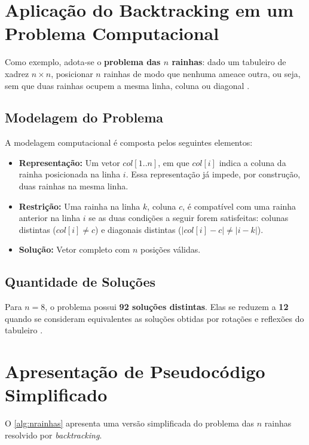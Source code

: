 \section{Aplicação do Backtracking em um Problema Computacional}

Como exemplo, adota-se o \textbf{problema das $n$ rainhas}: dado um tabuleiro de xadrez $n \times n$, posicionar $n$ rainhas de modo que nenhuma ameace outra, ou seja, sem que duas rainhas ocupem a mesma linha, coluna ou diagonal \cite{levitin2011, russell2013}.

\subsection{Modelagem do Problema}

A modelagem computacional é composta pelos seguintes elementos:

\begin{itemize}
    \item \textbf{Representação:} Um vetor $col[1..n]$, em que $col[i]$ indica a coluna da rainha posicionada na linha $i$. Essa representação já impede, por construção, duas rainhas na mesma linha.
    \item \textbf{Restrição:} Uma rainha na linha $k$, coluna $c$, é compatível com uma rainha anterior na linha $i$ se as duas condições a seguir forem satisfeitas: colunas distintas ($col[i] \neq c$) e diagonais distintas ($|col[i] - c| \neq |i - k|$).
    \item \textbf{Solução:} Vetor completo com $n$ posições válidas.
\end{itemize}

\subsection{Quantidade de Soluções}

Para $n = 8$, o problema possui \textbf{92 soluções distintas}. Elas se reduzem a \textbf{12} quando se consideram equivalentes as soluções obtidas por rotações e reflexões do tabuleiro \cite{levitin2011}.

\section{Apresentação de Pseudocódigo Simplificado}

O \autoref{alg:nrainhas} apresenta uma versão simplificada do problema das $n$ rainhas resolvido por \textit{backtracking}.

